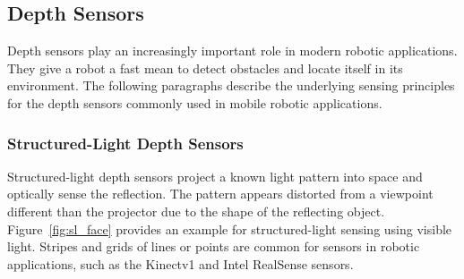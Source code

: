 \subsection{Depth Sensors}

Depth sensors play an increasingly important role in modern robotic applications.
They give a robot a fast mean to detect obstacles and locate itself in its environment.
The following paragraphs describe the underlying sensing principles\cite{blais_2003} for the depth sensors commonly used in mobile robotic applications.

\subsubsection{Structured-Light Depth Sensors}

Structured-light depth sensors project a known light pattern into space and optically sense the reflection.
The pattern appears distorted from a viewpoint different than the projector due to the shape of the reflecting object.
Figure~\ref{fig:sl_face} provides an example for structured-light sensing using visible light.
Stripes and grids of lines or points are common for sensors in robotic applications, such as the Kinectv1 and Intel RealSense\cite{intel_realsense} sensors.
